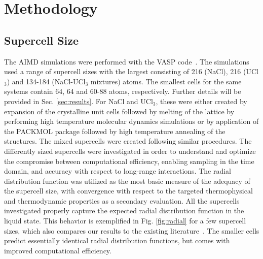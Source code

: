 \documentclass[preprint,3p,10pt,twocolumn,number,sort&compress]{elsarticle}
\begin{document}
\section{Methodology}
\label{sec:method}

\subsection{Supercell Size}
The AIMD simulations were performed with the VASP code~\cite{}. The simulations used a range of supercell sizes with the largest consisting of 216 (NaCl), 216 (UCl$_3$) and 134-184 (NaCl-UCl$_3$ mixtures) atoms. The smallest cells for the same systems contain 64, 64 and 60-88 atoms, respectively. Further details will be provided in Sec. \ref{sec:results}. For NaCl and UCl$_3$, these were either created by expansion of the crystalline unit cells followed by melting of the lattice by performing high temperature molecular dynamics simulations or by application of the PACKMOL package \cite{} followed by high temperature annealing of the structures. 
The mixed supercells were created following similar procedures. 
The differently sized supercells were investigated in order to understand and optimize the compromise between computational efficiency, enabling sampling in the time domain, and accuracy with respect to long-range interactions. The radial distribution function was utilized as the most basic measure of the adequacy of the supercell size, with convergence with respect to the targeted thermophysical and thermodynamic properties as a secondary evaluation. 
All the supercells investigated properly capture the expected radial distribution function in the liquid state. %
This behavior is exemplified in Fig. \ref{fig:radial} for a few supercell sizes, which also compares our results to the existing literature~\cite{}. The smaller cells predict essentially identical radial distribution functions, but comes with improved computational efficiency. %
\end{document}
